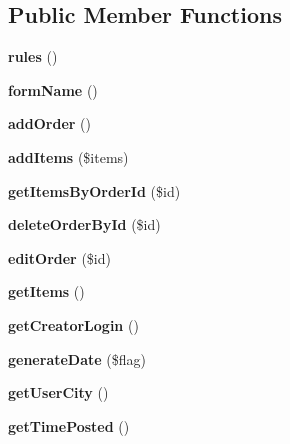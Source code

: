 \subsection*{Public Member Functions}
\begin{DoxyCompactItemize}
\item 
\hypertarget{classapp_1_1models_1_1_order_a17dba92d96b9dd48c62f3ede3eef94d4}{}\label{classapp_1_1models_1_1_order_a17dba92d96b9dd48c62f3ede3eef94d4} 
{\bfseries rules} ()
\item 
\hypertarget{classapp_1_1models_1_1_order_afd2e4b9f8bf18ff12e1c13c06fd0438d}{}\label{classapp_1_1models_1_1_order_afd2e4b9f8bf18ff12e1c13c06fd0438d} 
{\bfseries form\+Name} ()
\item 
\hypertarget{classapp_1_1models_1_1_order_a3ee5031f29f0a213e6e9aaeb6b1cbaf6}{}\label{classapp_1_1models_1_1_order_a3ee5031f29f0a213e6e9aaeb6b1cbaf6} 
{\bfseries add\+Order} ()
\item 
\hypertarget{classapp_1_1models_1_1_order_ac3a4371fdbba188b1545a8e77d222bb1}{}\label{classapp_1_1models_1_1_order_ac3a4371fdbba188b1545a8e77d222bb1} 
{\bfseries add\+Items} (\$items)
\item 
\hypertarget{classapp_1_1models_1_1_order_a41667b506246cdab68dfde8bf6bf9f73}{}\label{classapp_1_1models_1_1_order_a41667b506246cdab68dfde8bf6bf9f73} 
{\bfseries get\+Items\+By\+Order\+Id} (\$id)
\item 
\hypertarget{classapp_1_1models_1_1_order_a7cd29143d80b25263fca798fbca75474}{}\label{classapp_1_1models_1_1_order_a7cd29143d80b25263fca798fbca75474} 
{\bfseries delete\+Order\+By\+Id} (\$id)
\item 
\hypertarget{classapp_1_1models_1_1_order_a17b0e0eec2ecf37ae07fd0e7743db245}{}\label{classapp_1_1models_1_1_order_a17b0e0eec2ecf37ae07fd0e7743db245} 
{\bfseries edit\+Order} (\$id)
\item 
\hypertarget{classapp_1_1models_1_1_order_ab20ac3660e2d867b235b004bd3950ec3}{}\label{classapp_1_1models_1_1_order_ab20ac3660e2d867b235b004bd3950ec3} 
{\bfseries get\+Items} ()
\item 
\hypertarget{classapp_1_1models_1_1_order_aa7b4f361a03c18924cf724c49647a525}{}\label{classapp_1_1models_1_1_order_aa7b4f361a03c18924cf724c49647a525} 
{\bfseries get\+Creator\+Login} ()
\item 
\hypertarget{classapp_1_1models_1_1_order_a3346e13f18c329be8e4754296e5e2f04}{}\label{classapp_1_1models_1_1_order_a3346e13f18c329be8e4754296e5e2f04} 
{\bfseries generate\+Date} (\$flag)
\item 
\hypertarget{classapp_1_1models_1_1_order_a6c016fc42dc005b154ec760484838d6f}{}\label{classapp_1_1models_1_1_order_a6c016fc42dc005b154ec760484838d6f} 
{\bfseries get\+User\+City} ()
\item 
\hypertarget{classapp_1_1models_1_1_order_ae835fb16cefe7ee68a0c422c5b0d475c}{}\label{classapp_1_1models_1_1_order_ae835fb16cefe7ee68a0c422c5b0d475c} 
{\bfseries get\+Time\+Posted} ()
\end{DoxyCompactItemize}
